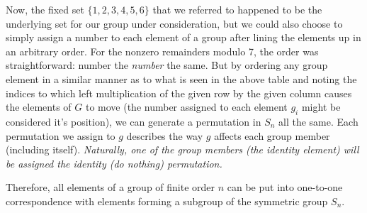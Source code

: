 \documentclass{article}
\begin{document}
Now, the fixed set $\{1, 2, 3, 4, 5, 6\}$ that we referred to happened to be the underlying set for our group under consideration, but we could also choose to simply assign a number to each element of a group after lining the elements up in an arbitrary order. For the nonzero remainders modulo 7, the order was straightforward: number the \textit{number} the same. But by ordering any group element in a similar manner as to what is seen in the above table and noting the indices to which left multiplication of the given row by the given column causes the elements of $G$ to move (the number assigned to each element $g_i$ might be considered it's position), we can generate a permutation in $S_n$ all the same. Each permutation we assign to $g$ describes the way $g$ affects each group member (including itself). \textit{Naturally, one of the group members (the identity element) will be assigned the identity (do nothing) permutation.}

Therefore, all elements of a group of finite order $n$ can be put into one-to-one correspondence with elements forming a subgroup of the symmetric group $S_n$.
\end{document}
